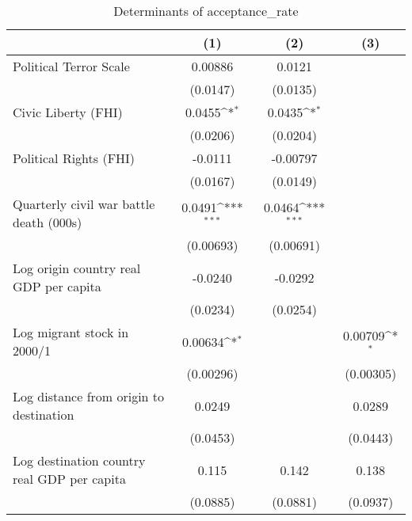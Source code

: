 \begin{table}[htbp]\centering
\def\sym#1{\ifmmode^{#1}\else\(^{#1}\)\fi}
\caption{Determinants of acceptance\_rate}
\begin{tabular}{l*{3}{c}}
\hline\hline
                    &\multicolumn{1}{c}{(1)}         &\multicolumn{1}{c}{(2)}         &\multicolumn{1}{c}{(3)}         \\
\hline
Political Terror Scale&     0.00886         &      0.0121         &                     \\
                    &    (0.0147)         &    (0.0135)         &                     \\
[1em]
Civic Liberty (FHI) &      0.0455\sym{*}  &      0.0435\sym{*}  &                     \\
                    &    (0.0206)         &    (0.0204)         &                     \\
[1em]
Political Rights (FHI)&     -0.0111         &    -0.00797         &                     \\
                    &    (0.0167)         &    (0.0149)         &                     \\
[1em]
Quarterly civil war battle death (000s)&      0.0491\sym{***}&      0.0464\sym{***}&                     \\
                    &   (0.00693)         &   (0.00691)         &                     \\
[1em]
Log origin country real GDP per capita&     -0.0240         &     -0.0292         &                     \\
                    &    (0.0234)         &    (0.0254)         &                     \\
[1em]
Log migrant stock in 2000/1&     0.00634\sym{*}  &                     &     0.00709\sym{*}  \\
                    &   (0.00296)         &                     &   (0.00305)         \\
[1em]
Log distance from origin to destination&      0.0249         &                     &      0.0289         \\
                    &    (0.0453)         &                     &    (0.0443)         \\
[1em]
Log destination country real GDP per capita&       0.115         &       0.142         &       0.138         \\
                    &    (0.0885)         &    (0.0881)         &    (0.0937)         \\

\end{tabular}
\end{table}
